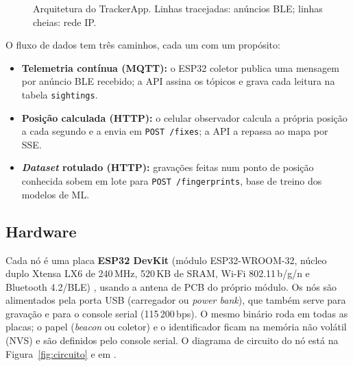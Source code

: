 \documentclass[12pt]{article}
\newcommand{\arq}[1]{\texttt{\detokenize{#1}}}
\begin{document}
\begin{figure}[htb]
\caption{Arquitetura do TrackerApp. Linhas tracejadas: anúncios BLE; linhas cheias: rede IP.}
\label{fig:arquitetura}
\end{figure}

O fluxo de dados tem três caminhos, cada um com um propósito:
\begin{itemize}
  \item \textbf{Telemetria contínua (MQTT):} o ESP32 coletor publica uma mensagem por anúncio BLE
    recebido; a API assina os tópicos e grava cada leitura na tabela \texttt{sightings}.
  \item \textbf{Posição calculada (HTTP):} o celular observador calcula a própria posição a cada
    segundo e a envia em \texttt{POST /fixes}; a API a repassa ao mapa por SSE.
  \item \textbf{\textit{Dataset} rotulado (HTTP):} gravações feitas num ponto de posição conhecida
    sobem em lote para \texttt{POST /fingerprints}, base de treino dos modelos de ML.
\end{itemize}

\subsection{Hardware}
Cada nó é uma placa \textbf{ESP32 DevKit} (módulo ESP32-WROOM-32, núcleo duplo Xtensa LX6 de
240\,MHz, 520\,KB de SRAM, Wi-Fi 802.11\,b/g/n e Bluetooth 4.2/BLE) \cite{espressif2023esp32},
usando a antena de PCB do próprio módulo. Os nós são alimentados pela porta USB (carregador ou
\textit{power bank}), que também serve para gravação e para o console serial (115\,200\,bps). O
mesmo binário roda em todas as placas; o papel (\textit{beacon} ou coletor) e o identificador ficam
na memória não volátil (NVS) e são definidos pelo console serial. O diagrama de circuito do nó está
na Figura~\ref{fig:circuito} e em \arq{schematics/}.
\end{document}
